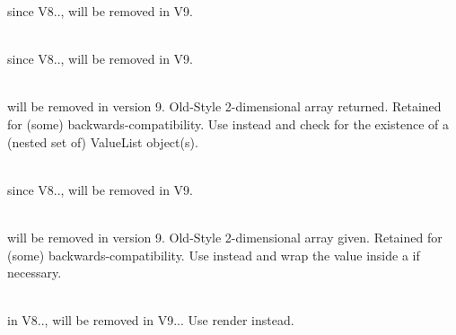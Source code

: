 \begin{DoxyRefList}
\label{deprecated__deprecated000400}%
%
since V8.., will be removed in V9.  
\item[Global \doxylink{class_sabberworm_1_1_c_s_s_1_1_rule_1_1_rule_ab349f002e94306b44b7147f11ec7cec2}{Rule\+::get\+Ie\+Hack} ()]\hfill \\
\label{deprecated__deprecated000402}%
%
since V8.., will be removed in V9.  
\item[Global \doxylink{class_sabberworm_1_1_c_s_s_1_1_rule_1_1_rule_a70a0fe08035189260c72e32a9e20d30c}{Rule\+::get\+Values} ()]\hfill \\
\label{deprecated__deprecated000399}%
%
will be removed in version 9. Old-\/\+Style 2-\/dimensional array returned. Retained for (some) backwards-\/compatibility. Use {\ttfamily {}} instead and check for the existence of a (nested set of) Value\+List object(s).  
\item[Global \doxylink{class_sabberworm_1_1_c_s_s_1_1_rule_1_1_rule_a6e0cb3bcc22996460072796e7eeee855}{Rule\+::set\+Ie\+Hack} (array \$a\+Modifiers)]\hfill \\
\label{deprecated__deprecated000401}%
%
since V8.., will be removed in V9.  
\item[Global \doxylink{class_sabberworm_1_1_c_s_s_1_1_rule_1_1_rule_aa9783510713faf3577f6cb7b55c908d0}{Rule\+::set\+Values} (array \$a\+Space\+Separated\+Values)]\hfill \\
\label{deprecated__deprecated000398}%
%
will be removed in version 9. Old-\/\+Style 2-\/dimensional array given. Retained for (some) backwards-\/compatibility. Use {\ttfamily {}} instead and wrap the value inside a  if necessary.  
\item[Global \doxylink{class_sabberworm_1_1_c_s_s_1_1_rule_set_1_1_rule_set_a7516ca30af0db3cdbf9a7739b48ce91d}{Rule\+Set\+::\+\_\+\+\_\+to\+String} ()]\hfill \\
\label{deprecated__deprecated000421}%
%
in V8.., will be removed in V9... Use {\ttfamily render} instead.  
\item[Global \doxylink{class_sebastian_bergmann_1_1_environment_1_1_runtime_a138a1d5494c18de73ffa2e00c3710dee}{Runtime\+::get\+Binary} ()]\hfill \\
\label{deprecated__deprecated000430}%
%
  

\end{DoxyRefList}
